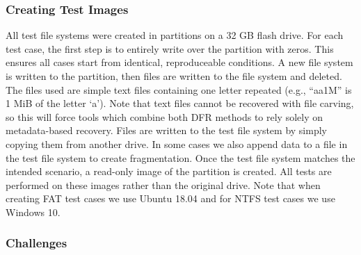 \documentclass{ws-rv9x6}
\newenvironment{paraphrase}{\color{blue}}{\color{black}} %
\begin{document}
\subsubsection{Creating Test Images}

\begin{paraphrase}
 All test file systems were created in partitions on a 32 GB flash drive. For each test case, the first step is to entirely write over the partition with zeros. This ensures all cases start from identical, reproduceable conditions. A new file system is written to the partition, then files are written to the file system and deleted. The files used are simple text files containing one letter repeated (e.g., ``aa1M'' is 1 MiB of the letter `a').
 \end{paraphrase}
 Note that text files cannot be recovered with file carving, so this will force tools which combine both DFR methods to rely solely on metadata-based recovery.
 \begin{paraphrase}
 Files are written to the test file system by simply copying them from another drive. In some cases we also append data to a file in the test file system to create fragmentation. Once the test file system matches the intended scenario, a read-only image of the partition is created. All tests are performed on these images rather than the original drive. Note that when creating FAT test cases we use Ubuntu 18.04 and for NTFS test cases we use Windows 10.
\end{paraphrase}

\subsubsection{Challenges}
\end{document}
